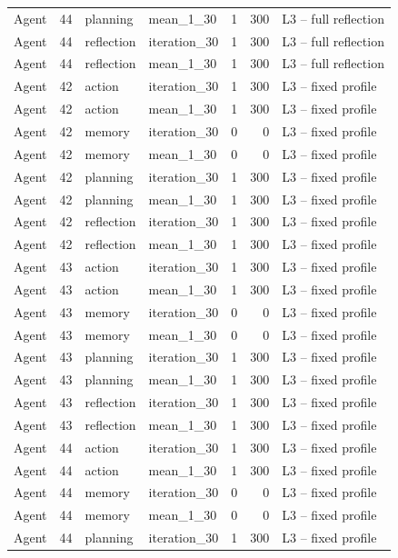 \begin{table}[htbp!]
\begin{tabular}{lrllrrl}
Agent & 44 & planning & mean\_1\_30 & 1 & 300 & L3 -- full reflection \\
Agent & 44 & reflection & iteration\_30 & 1 & 300 & L3 -- full reflection \\
Agent & 44 & reflection & mean\_1\_30 & 1 & 300 & L3 -- full reflection \\
Agent & 42 & action & iteration\_30 & 1 & 300 & L3 -- fixed profile \\
Agent & 42 & action & mean\_1\_30 & 1 & 300 & L3 -- fixed profile \\
Agent & 42 & memory & iteration\_30 & 0 & 0 & L3 -- fixed profile \\
Agent & 42 & memory & mean\_1\_30 & 0 & 0 & L3 -- fixed profile \\
Agent & 42 & planning & iteration\_30 & 1 & 300 & L3 -- fixed profile \\
Agent & 42 & planning & mean\_1\_30 & 1 & 300 & L3 -- fixed profile \\
Agent & 42 & reflection & iteration\_30 & 1 & 300 & L3 -- fixed profile \\
Agent & 42 & reflection & mean\_1\_30 & 1 & 300 & L3 -- fixed profile \\
Agent & 43 & action & iteration\_30 & 1 & 300 & L3 -- fixed profile \\
Agent & 43 & action & mean\_1\_30 & 1 & 300 & L3 -- fixed profile \\
Agent & 43 & memory & iteration\_30 & 0 & 0 & L3 -- fixed profile \\
Agent & 43 & memory & mean\_1\_30 & 0 & 0 & L3 -- fixed profile \\
Agent & 43 & planning & iteration\_30 & 1 & 300 & L3 -- fixed profile \\
Agent & 43 & planning & mean\_1\_30 & 1 & 300 & L3 -- fixed profile \\
Agent & 43 & reflection & iteration\_30 & 1 & 300 & L3 -- fixed profile \\
Agent & 43 & reflection & mean\_1\_30 & 1 & 300 & L3 -- fixed profile \\
Agent & 44 & action & iteration\_30 & 1 & 300 & L3 -- fixed profile \\
Agent & 44 & action & mean\_1\_30 & 1 & 300 & L3 -- fixed profile \\
Agent & 44 & memory & iteration\_30 & 0 & 0 & L3 -- fixed profile \\
Agent & 44 & memory & mean\_1\_30 & 0 & 0 & L3 -- fixed profile \\
Agent & 44 & planning & iteration\_30 & 1 & 300 & L3 -- fixed profile \\

\end{tabular}
\end{table}
